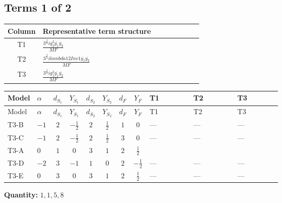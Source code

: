 \documentclass[8pt]{article}
\begin{document}
\begin{landscape}
\subsection*{Terms 1 of 2}
\begin{center}
\begin{tabular}{@{}c >{\raggedright\arraybackslash}p{0.82\linewidth}@{}}
\toprule
Column & Representative term structure \\
\midrule
T1 & \(\displaystyle \frac{3^{\frac{3}{4}} i g_{2}^{2} \overline{y_{1}} \overline{y_{2}}}{MF}\) \\
\midrule
T2 & \(\displaystyle \frac{3^{\frac{3}{4}} i lambda12Inv1 \overline{y_{1}} \overline{y_{2}}}{MF}\) \\
\midrule
T3 & \(\displaystyle \frac{3^{\frac{3}{4}} i g_{1}^{2} \overline{y_{1}} \overline{y_{2}}}{MF}\) \\
\midrule
\bottomrule
\end{tabular}
\end{center}
\smallskip
\tiny
\begin{longtable}{@{}llcccccc >{\raggedright\arraybackslash}p{0.21\linewidth} >{\raggedright\arraybackslash}p{0.21\linewidth} >{\raggedright\arraybackslash}p{0.21\linewidth}@{}}
\toprule
Model & $\alpha$ & $d_{S_1}$ & $Y_{S_1}$ & $d_{S_2}$ & $Y_{S_2}$ & $d_F$ & $Y_F$ & T1 & T2 & T3 \\
\midrule
\endfirsthead
\toprule
Model & $\alpha$ & $d_{S_1}$ & $Y_{S_1}$ & $d_{S_2}$ & $Y_{S_2}$ & $d_F$ & $Y_F$ & T1 & T2 & T3 \\
\midrule
\endhead
T3-B & $-1$ & $2$ & $-\frac{1}{2}$ & $2$ & $\frac{1}{2}$ & $1$ & $0$ & --- & --- & --- \\
\midrule
T3-C & $-1$ & $2$ & $-\frac{1}{2}$ & $2$ & $\frac{1}{2}$ & $3$ & $0$ & --- & --- & --- \\
\midrule
T3-A & $0$ & $1$ & $0$ & $3$ & $1$ & $2$ & $\frac{1}{2}$ & \scriptsize\adjustbox{max width=\linewidth}{$\begin{gathered} - \frac{11 \cdot 3^{\frac{3}{4}} i g_{2}^{2} \overline{y_{1}} \overline{y_{2}}}{8 MF}\end{gathered}$} & \scriptsize\adjustbox{max width=\linewidth}{$\begin{gathered} - \frac{3^{\frac{3}{4}} i lambda12Inv1 \overline{y_{1}} \overline{y_{2}}}{6 MF}\end{gathered}$} & \scriptsize\adjustbox{max width=\linewidth}{$\begin{gathered} - \frac{3^{\frac{3}{4}} i g_{1}^{2} \overline{y_{1}} \overline{y_{2}}}{8 MF}\end{gathered}$} \\
\midrule
T3-D & $-2$ & $3$ & $-1$ & $1$ & $0$ & $2$ & $-\frac{1}{2}$ & --- & --- & --- \\
\midrule
T3-E & $0$ & $3$ & $0$ & $3$ & $1$ & $2$ & $\frac{1}{2}$ & --- & --- & --- \\
\midrule
\bottomrule
\end{longtable}
\clearpage
\noindent\textbf{Quantity: }$\mathrm{1,1,5,8}$\par\smallskip

\end{landscape}
\end{document}
